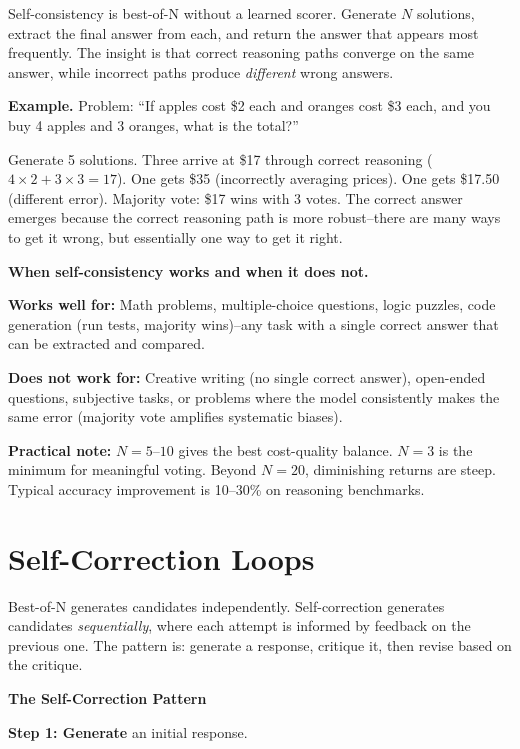 \begin{chapterenv}
Self-consistency is best-of-N without a learned scorer. Generate $N$ solutions, extract the final answer from each, and return the answer that appears most frequently. The insight is that correct reasoning paths converge on the same answer, while incorrect paths produce \textit{different} wrong answers.

\textbf{Example.} Problem: ``If apples cost \$2 each and oranges cost \$3 each, and you buy 4 apples and 3 oranges, what is the total?''

Generate 5 solutions. Three arrive at \$17 through correct reasoning ($4 \times 2 + 3 \times 3 = 17$). One gets \$35 (incorrectly averaging prices). One gets \$17.50 (different error). Majority vote: \$17 wins with 3 votes. The correct answer emerges because the correct reasoning path is more robust--there are many ways to get it wrong, but essentially one way to get it right.

\begin{tipbox}
\textbf{When self-consistency works and when it does not.}

\textbf{Works well for:} Math problems, multiple-choice questions, logic puzzles, code generation (run tests, majority wins)--any task with a single correct answer that can be extracted and compared.

\textbf{Does not work for:} Creative writing (no single correct answer), open-ended questions, subjective tasks, or problems where the model consistently makes the same error (majority vote amplifies systematic biases).

\textbf{Practical note:} $N = 5$--$10$ gives the best cost-quality balance. $N = 3$ is the minimum for meaningful voting. Beyond $N = 20$, diminishing returns are steep. Typical accuracy improvement is 10--30\% on reasoning benchmarks.
\end{tipbox}

\section{Self-Correction Loops}

Best-of-N generates candidates independently. Self-correction generates candidates \textit{sequentially}, where each attempt is informed by feedback on the previous one. The pattern is: generate a response, critique it, then revise based on the critique.

\begin{infobox}
\textbf{The Self-Correction Pattern}

\textbf{Step 1: Generate} an initial response.


\end{infobox}
\end{chapterenv}
